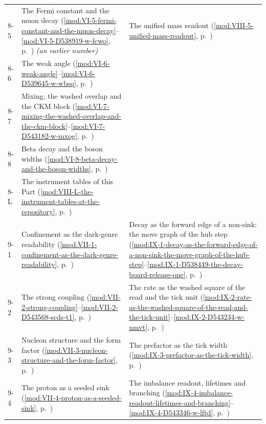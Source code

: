 {\begin{longtable}{p{11mm}p{70mm}p{60mm}}
8-5 & The Fermi constant and the muon decay (\ref{mod:VI-5-fermi-constant-and-the-muon-decay}--\ref{mod:VI-5-D538919-w-fcwo}, p.~\pageref{mod:VI-5-fermi-constant-and-the-muon-decay}) \emph{(an earlier number)} & The unified mass readout (\ref{mod:VIII-5-unified-mass-readout}, p.~\pageref{mod:VIII-5-unified-mass-readout}) \\
8-6 & The weak angle (\ref{mod:VI-6-weak-angle}--\ref{mod:VI-6-D539645-w-wbsq}, p.~\pageref{mod:VI-6-weak-angle}) &  \\
8-7 & Mixing, the washed overlap and the CKM block (\ref{mod:VI-7-mixing-the-washed-overlap-and-the-ckm-block}--\ref{mod:VI-7-D543182-w-mxog}, p.~\pageref{mod:VI-7-mixing-the-washed-overlap-and-the-ckm-block}) &  \\
8-8 & Beta decay and the boson widths (\ref{mod:VI-8-beta-decay-and-the-boson-widths}, p.~\pageref{mod:VI-8-beta-decay-and-the-boson-widths}) &  \\
8-L & The instrument tables of this Part (\ref{mod:VIII-L-the-instrument-tables-at-the-repository}, p.~\pageref{mod:VIII-L-the-instrument-tables-at-the-repository}) &  \\
9-1 & Confinement as the dark-genre readability (\ref{mod:VII-1-confinement-as-the-dark-genre-readability}, p.~\pageref{mod:VII-1-confinement-as-the-dark-genre-readability}) & Decay as the forward edge of a non-sink: the move graph of the hub step (\ref{mod:IX-1-decay-as-the-forward-edge-of-a-non-sink-the-move-graph-of-the-hub-step}--\ref{mod:IX-1-D538449-the-decay-board-release-one}, p.~\pageref{mod:IX-1-decay-as-the-forward-edge-of-a-non-sink-the-move-graph-of-the-hub-step}) \\
9-2 & The strong coupling (\ref{mod:VII-2-strong-coupling}--\ref{mod:VII-2-D543568-scds-t1}, p.~\pageref{mod:VII-2-strong-coupling}) & The rate as the washed square of the read and the tick unit (\ref{mod:IX-2-rate-as-the-washed-square-of-the-read-and-the-tick-unit}--\ref{mod:IX-2-D543234-w-nmvt}, p.~\pageref{mod:IX-2-rate-as-the-washed-square-of-the-read-and-the-tick-unit}) \\
9-3 & Nucleon structure and the form factor (\ref{mod:VII-3-nucleon-structure-and-the-form-factor}, p.~\pageref{mod:VII-3-nucleon-structure-and-the-form-factor}) & The prefactor as the tick width (\ref{mod:IX-3-prefactor-as-the-tick-width}, p.~\pageref{mod:IX-3-prefactor-as-the-tick-width}) \\
9-4 & The proton as a seeded sink (\ref{mod:VII-4-proton-as-a-seeded-sink}, p.~\pageref{mod:VII-4-proton-as-a-seeded-sink}) & The imbalance readout, lifetimes and branching (\ref{mod:IX-4-imbalance-readout-lifetimes-and-branching}--\ref{mod:IX-4-D543346-w-lftd}, p.~\pageref{mod:IX-4-imbalance-readout-lifetimes-and-branching}) \\

\end{longtable}}
